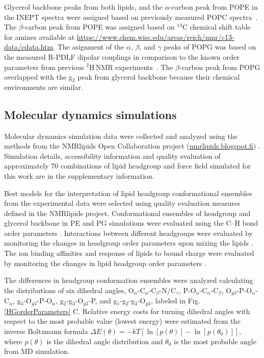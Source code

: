 \documentclass[aps,prl,superscriptaddress,twocolumn]{revtex4}
\begin{document}
Glycerol backbone peaks from both lipids, and the $\alpha$-carbon peak from POPE in the INEPT spectra 
were assigned based on previously measured POPC spectra~\cite{ferreira13}.
The $\beta$-carbon peak from POPE was assigned based on $^{13}$C chemical shift table for amines available
at \url{https://www.chem.wisc.edu/areas/reich/nmr/c13-data/cdata.htm}. The asignment of the $\alpha$, $\beta$, and $\gamma$ peaks of POPG was based on the measured R-PDLF dipolar couplings in comparison to the known order parameters from previous $^2$H\,NMR experiments~\cite{borle85,wohlgemuth80}.   
The $\beta$-carbon peak from POPG overlapped with the g$_2$ peak from glycerol backbone
because their chemical environments are similar.

\subsection{Molecular dynamics simulations}

Molecular dynamics simulation data were collected and analyzed using
the methods from the NMRlipids Open Collaboration project (\url{nmrlipids.blogspot.fi}) \cite{botan15,catte16,ollila16,antila19}.
Simulation details, accessibility information and quality evaluation of approximately 70 combinations of lipid headgroup and force field simulated for this work are in the supplementary information.

Best models for the interpretation of lipid headgroup conformational ensembles from the experimental data were selected
using quality evaluation measures defined in the NMRlipids project.
Conformational ensembles of headgroup and glycerol backbone in PE and PG simulations were evaluated using the C--H bond order parameters \cite{botan15}. Interactions between different headgroups were evaluated by monitoring the changes in headgroup order parameters upon mixing the lipids \cite{antila19}. The ion binding affinities and response of lipids to bound charge were evaluated by monitoring the changes in lipid headgroup order parameters \cite{catte16,antila19}.

The differences in headgroup conformation ensembles were analyzed calculating the distributions of six dihedral angles, O$_\alpha$-C$_\alpha$-C$_\beta$-N/C$_\gamma$, P-O$_\alpha$-C$_\alpha$-C$_\beta$, O$_{g3}$-P-O$_\alpha$-C$_\alpha$, g$_3$-O$_{g3}$-P-O$_\alpha$, g$_2$-g$_3$-O$_{g3}$-P, and g$_1$-g$_2$-g$_3$-O$_{g3}$, labeled in Fig. \ref{HGorderParameters} C. Relative energy costs for turning dihedral angles with respect to the most probable value (lowest energy) were estimated from the inverse Boltzmann formula $\Delta E(\theta) = -kT \left[\ln\left[p(\theta)\right]-\ln\left[p(\theta_0)\right] \right]$, where $p(\theta)$ is the dihedral angle distribution and $\theta_0$ is the most probable angle from MD simulation.
\end{document}
